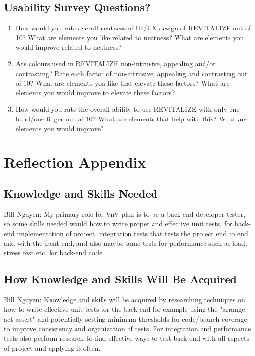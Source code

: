 \documentclass[12pt, titlepage]{article}
\begin{document}
\subsection{Usability Survey Questions?}


\begin{enumerate}
	\item How would you rate overall neatness of UI/UX design of REVITALIZE out of 10? What are elements you like related to neatness? What are elements you would improve related to neatness?
	\item Are colours used in REVITALIZE non-intrusive, appealing and/or contrasting? Rate each factor of non-intrusive, appealing and contrasting out of 10? What are elements you like that elevate these factors? What are elements you would improve to elevate these factors?
	\item How would you rate the overall ability to use REVITALIZE with only one hand/one finger out of 10? What are elements that help with this? What are elements you would improve?
\end{enumerate}

\section{Reflection Appendix}

\subsection{Knowledge and Skills Needed}

\noindent Bill Nguyen: My primary role for VnV plan is to be a back-end developer tester, so some skills needed would how to write proper and effective unit tests, for back-end implementation of project, integration tests that tests the project end to end and with the front-end, and also maybe some tests for performance such as load, stress test etc. for back-end code.\\

\subsection{How Knowledge and Skills Will Be Acquired}

\noindent Bill Nguyen: Knowledge and skills will be acquired by researching techniques on how to write effective unit tests for the back-end for example using the "arrange act assert" and potentially setting minimum thresholds for code/branch coverage to improve consistency and organization of tests. For integration and performance tests also perform research to find effective ways to test back-end with all aspects of project and applying it often.\\
\end{document}
